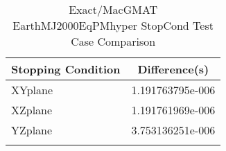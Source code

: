 \begin{table}[htbp!]
\centering
\caption{ Exact/MacGMAT EarthMJ2000EqPMhyper StopCond Test Case Comparison}
      \begin{tabular}{lc}
      \hline\hline
          Stopping Condition & Difference(s) \\
         \hline
         XYplane & 1.191763795e-006 \\
         XZplane & 1.191761969e-006 \\
         YZplane & 3.753136251e-006 \\
      \hline\hline
      \label{Table: Exact-MacGMAT EarthMJ2000EqPMhyper StopCond Table} 
\end{tabular}
\end{table}
